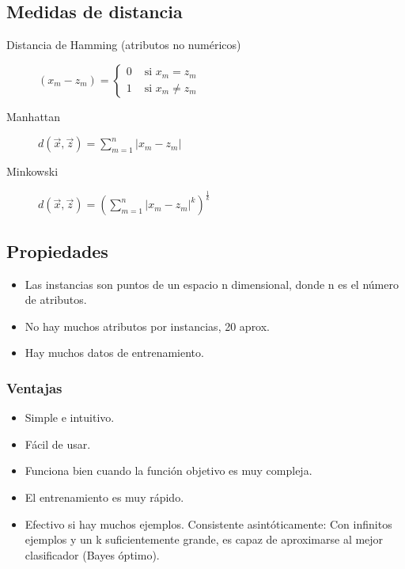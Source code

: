 \documentclass[12pt, twoside, openright]{report} %
\begin{document}
\subsection{Medidas de distancia}
\begin{description}
  \item[Distancia de Hamming (atributos no numéricos)] $\left(x_{m}-z_{m}\right)=\left\{\begin{array}{ll}0 & \text { si } x_{m}=z_{m} \\ 1 & \text { si } x_{m} \neq z_{m}\end{array}\right.$
  \item[Manhattan] $d(\vec{x}, \vec{z})=\sum_{m=1}^{n}\left|x_{m}-z_{m}\right|$
  \item[Minkowski] $d(\vec{x}, \vec{z})=\left(\sum_{m=1}^{n}\left|x_{m}-z_{m}\right|^{k}\right)^{\frac{1}{k}}$
\end{description}
\pagebreak
\subsection{Propiedades}
\begin{itemize}
  \item Las instancias son puntos de un espacio n dimensional, donde n es el número de atributos.

  \item No hay muchos atributos por instancias, 20 aprox.

  \item Hay muchos datos de entrenamiento.

\end{itemize}

\subsubsection{Ventajas}
\begin{itemize}
  \item Simple e intuitivo.

  \item Fácil de usar.

  \item Funciona bien cuando la función objetivo es muy compleja.

  \item El entrenamiento es muy rápido.

  \item Efectivo si hay muchos ejemplos. Consistente asintóticamente: Con infinitos ejemplos y un k suficientemente grande, es capaz de aproximarse al mejor clasificador (Bayes óptimo).

\end{itemize}
\end{document}
